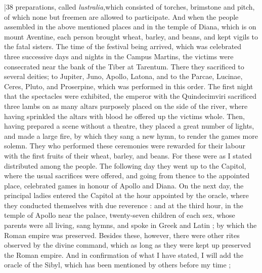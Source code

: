 |38 preparations, called \emph{lustralia,}which consisted of torches, brimstone and pitch, of which none but freemen are allowed to participate. And when the people assembled in the above mentioned places and in the temple of Diana, which is on mount Aventine, each person brought wheat, barley, and beans, and kept vigils to the fatal sisters. The time of the festival being arrived, which was celebrated three successive days and nights in the Campus Martins, the victims were consecrated near the bank of the Tiber at Tarentum. There they sacrificed to several deities; to Jupiter, Juno, Apollo, Latona, and to the Parcae, Lucinae, Ceres, Pluto, and Proserpine, which was performed in this order. The first night that the spectacles were exhibited, the emperor with the Quindecimviri sacrificed three lambs on as many altars purposely placed on the side of the river, where having sprinkled the altars with blood he offered up the victims whole. Then, having prepared a scene without a theatre, they placed a great number of lights, and made a large fire, by which they sang a new hymn, to render the games more solemn. They who performed these ceremonies were rewarded for their labour with the first fruits of their wheat, barley, and beans. For these were as I stated distributed among the people. The following day they went up to the Capitol, where the usual sacrifices were offered, and going from thence to the appointed place, celebrated games in honour of Apollo and Diana. On the next day, the principal ladies entered the Capitol at the hour appointed by the oracle, where they conducted themselves with due reverence : and at the third hour, in the temple of Apollo near the palace, twenty-seven children of each sex, whose parents were all living, sang hymns, and spoke in Greek and Latin ; by which the Roman empire was preserved. Besides these, however, there were other rites observed by the divine command, which as long as they were kept up preserved the Roman empire. And in confirmation of what I have stated, I will add the oracle of the Sibyl, which has been mentioned by others before my time ;

